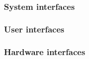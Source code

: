 \documentclass{article}
\begin{document}


\subsubsection{System interfaces}

\subsubsection{User interfaces}

\subsubsection{Hardware interfaces}
\end{document}
